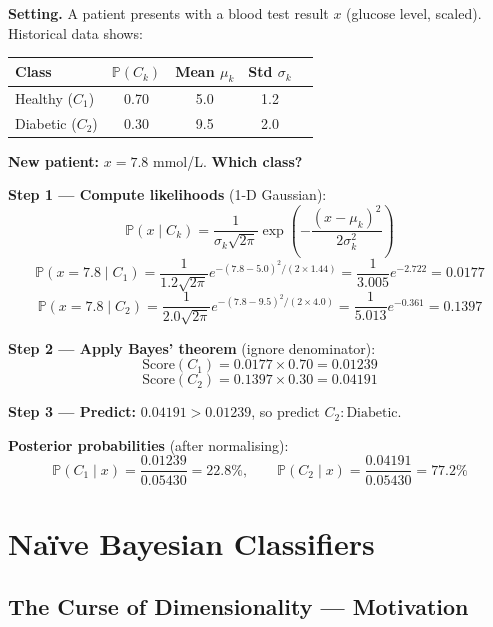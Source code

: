 \documentclass[12pt,a4paper]{article}
\newcommand{\Prob}{\mathbb{P}}
\begin{document}
\begin{tcolorbox}[exbox, title={Example 1: Disease Classification}]
\textbf{Setting.} A patient presents with a blood test result $x$ (glucose level, scaled). Historical data shows:

\medskip
\begin{center}
\begin{tabular}{lcccc}
\toprule
\textbf{Class} & $\Prob(C_k)$ & Mean $\mu_k$ & Std $\sigma_k$ \\
\midrule
Healthy ($C_1$) & 0.70 & 5.0 & 1.2 \\
Diabetic ($C_2$) & 0.30 & 9.5 & 2.0 \\
\bottomrule
\end{tabular}
\end{center}

\medskip
\textbf{New patient:} $x = 7.8$ mmol/L. \textbf{Which class?}

\medskip
\textbf{Step 1 — Compute likelihoods} (1-D Gaussian):
\[
  \Prob(x \mid C_k) = \frac{1}{\sigma_k\sqrt{2\pi}}\exp\!\left(-\frac{(x-\mu_k)^2}{2\sigma_k^2}\right)
\]
\[
  \Prob(x{=}7.8 \mid C_1) = \frac{1}{1.2\sqrt{2\pi}}e^{-(7.8-5.0)^2/(2\times1.44)}
  = \frac{1}{3.005}e^{-2.722} = 0.0177
\]
\[
  \Prob(x{=}7.8 \mid C_2) = \frac{1}{2.0\sqrt{2\pi}}e^{-(7.8-9.5)^2/(2\times4.0)}
  = \frac{1}{5.013}e^{-0.361} = 0.1397
\]

\textbf{Step 2 — Apply Bayes' theorem} (ignore denominator):
\[
  \text{Score}(C_1) = 0.0177 \times 0.70 = 0.01239
\]
\[
  \text{Score}(C_2) = 0.1397 \times 0.30 = 0.04191
\]

\textbf{Step 3 — Predict:}
$0.04191 > 0.01239$, so predict $\boxed{C_2: \text{Diabetic}}$.

\medskip
\textbf{Posterior probabilities} (after normalising):
\[
  \Prob(C_1 \mid x) = \frac{0.01239}{0.05430} = 22.8\%, \qquad
  \Prob(C_2 \mid x) = \frac{0.04191}{0.05430} = 77.2\%
\]
\end{tcolorbox}

\section{Na\"{i}ve Bayesian Classifiers}

\subsection{The Curse of Dimensionality — Motivation}
\end{document}
